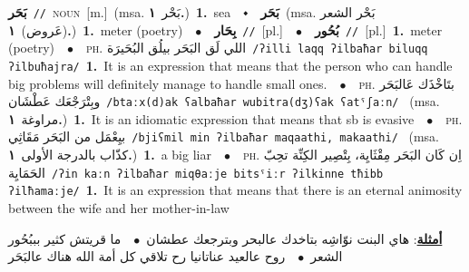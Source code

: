 \documentclass[10pt,a4paper,twoside]{article} %
\begin{document}
\begin{multicols}{2}
{\setlength\topsep{0pt}\textbf{\foreignlanguage{arabic}{بَحَر}}\ {\color{gray}\texttt{//}\color{black}}\ \textsc{noun}\ [m.]\ \color{gray}(msa. \foreignlanguage{arabic}{بَحْر}~\foreignlanguage{arabic}{\textbf{١.}})\color{black}\ \textbf{1.}~sea\ \ $\smblkdiamond$\ \ \setlength\topsep{0pt}\textbf{\foreignlanguage{arabic}{بَحَر}}\ \color{gray}(msa. \foreignlanguage{arabic}{بَحْر الشعر (عَروض)}~\foreignlanguage{arabic}{\textbf{١.}})\color{black}\ \textbf{1.}~meter (poetry)\ \ $\bullet$\ \ \setlength\topsep{0pt}\textbf{\foreignlanguage{arabic}{بِحَار}}\ {\color{gray}\texttt{//}\color{black}}\ [pl.]\ \ $\bullet$\ \ \setlength\topsep{0pt}\textbf{\foreignlanguage{arabic}{بُحُور}}\ {\color{gray}\texttt{//}\color{black}}\ [pl.]\ \textbf{1.}~meter (poetry)\ \ $\bullet$\ \ \textsc{ph.} \color{gray} \foreignlanguage{arabic}{اللي لَق البَحَر بيلُق البُحَيرَة}\color{black}\ {\color{gray}\texttt{/{\sffamily ʔilli laqq ʔilbaħar biluqq ʔilbuħajra}/}\color{black}}\ \textbf{1.}~It is an expression that means that the person who can handle big problems will definitely manage to handle small ones.\ \ $\bullet$\ \ \textsc{ph.} \color{gray} \foreignlanguage{arabic}{بتَاخْذَك عَالبَحَر وبِتْرَجْعَك عَطْشَان}\color{black}\ {\color{gray}\texttt{/{\sffamily btaːx(d)ak ʕalbaħar wubitra(dʒ)ʕak ʕatˤʃaːn}/}\color{black}}\ \color{gray} (msa. \foreignlanguage{arabic}{مراوغة}~\foreignlanguage{arabic}{\textbf{١.}})\color{black}\ \textbf{1.}~It is an idiomatic expression that means that sb is evasive\ \ $\bullet$\ \ \textsc{ph.} \color{gray} \foreignlanguage{arabic}{بيِعْمَل من البَحَر مَقَاثِي}\color{black}\ {\color{gray}\texttt{/{\sffamily bjiʕmil min ʔilbaħar maqaathi, makaathi}/}\color{black}}\ \color{gray} (msa. \foreignlanguage{arabic}{كذّاب بالدرجة الأولى}~\foreignlanguage{arabic}{\textbf{١.}})\color{black}\ \textbf{1.}~a big liar\ \ $\bullet$\ \ \textsc{ph.} \color{gray} \foreignlanguage{arabic}{اِن كَان البَحَر مِقْثَايِة، بِتْصِير الكِنِّة تحِبّ الحَمَايِة}\color{black}\ {\color{gray}\texttt{/{\sffamily ʔin kaːn ʔilbaħar miqθaːje bitsˤiːr ʔilkinne tħibb ʔilħamaːje}/}\color{black}}\ \textbf{1.}~It is an expression that means that there is an eternal animosity between the wife and her mother-in-law\  \begin{flushright}\color{gray}\foreignlanguage{arabic}{\textbf{\underline{\foreignlanguage{arabic}{أمثلة}}}: هاي البنت نوّاشِه بتاخدك عالبحر وبترجعك عطشان\ $\bullet$\ \  ما قريتش كثير بببُحُور الشعر\ $\bullet$\ \  روح عالعيد عناتانيا رح تلاقي كل أمة الله هناك عالبَحَر}\end{flushright}\color{black}} \vspace{2mm}


\end{multicols}
\end{document}
